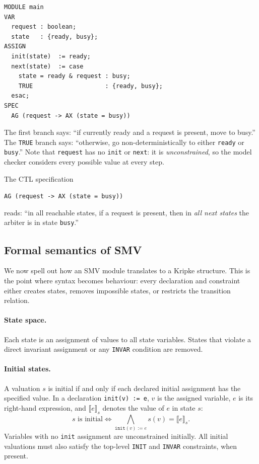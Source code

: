 \begin{example}
\label{ex:arbiter-smv}
\begin{verbatim}
MODULE main
VAR
  request : boolean;
  state   : {ready, busy};
ASSIGN
  init(state)  := ready;
  next(state)  := case
    state = ready & request : busy;
    TRUE                    : {ready, busy};
  esac;
SPEC
  AG (request -> AX (state = busy))
\end{verbatim}

The first branch says: ``if currently ready and a request is present, move
to busy.''  The \texttt{TRUE} branch says: ``otherwise, go
non-deterministically to either \texttt{ready} or \texttt{busy}.''  Note
that \texttt{request} has no \texttt{init} or \texttt{next}: it is
\emph{unconstrained}, so the model checker considers every possible value at
every step.

The CTL specification
\begin{center}
\texttt{AG (request -> AX (state = busy))}
\end{center}
reads:
``in all reachable states, if a request is present, then in \emph{all next
states} the arbiter is in state \texttt{busy}.''
\end{example}

\subsection{Formal semantics of SMV}
\label{sec:smv-semantics}

We now spell out how an SMV module translates to a Kripke structure.
This is the point where syntax becomes behaviour: every declaration and
constraint either creates states, removes impossible states, or restricts the
transition relation.

\paragraph{State space.}  Each state is an assignment of values to all
state variables.  States that violate a direct invariant assignment or any
\texttt{INVAR} condition are removed.

\paragraph{Initial states.}  A valuation $s$ is initial if and only if each
declared initial assignment has the specified value.  In a declaration
\texttt{init(v) := e}, $v$ is the assigned variable, $e$ is its right-hand
expression, and $\llbracket e\rrbracket_s$ denotes the value of $e$ in state
$s$:
\[
  s \text{ is initial} \iff
  \bigwedge_{\texttt{init}(v):=e} s(v)=\llbracket e\rrbracket_s .
\]
Variables with no \texttt{init} assignment are unconstrained initially.
All initial valuations must also satisfy the top-level \texttt{INIT} and
\texttt{INVAR} constraints, when present.

